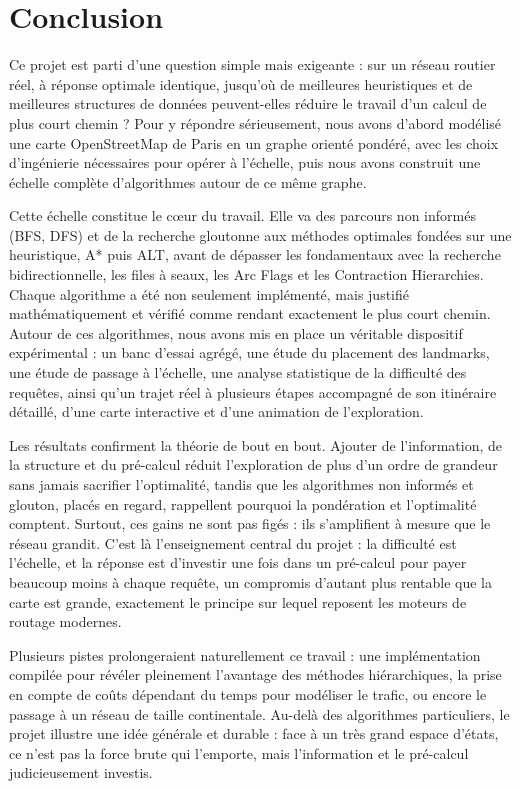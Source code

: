 \chapter{Conclusion}
\label{ch:conclusion}

Ce projet est parti d'une question simple mais exigeante : sur un réseau routier
réel, à réponse optimale identique, jusqu'où de meilleures heuristiques et de
meilleures structures de données peuvent-elles réduire le travail d'un calcul de
plus court chemin ? Pour y répondre sérieusement, nous avons d'abord modélisé une
carte OpenStreetMap de Paris en un graphe orienté pondéré, avec les choix
d'ingénierie nécessaires pour opérer à l'échelle, puis nous avons construit une
échelle complète d'algorithmes autour de ce même graphe.

\medskip

Cette échelle constitue le cœur du travail. Elle va des parcours non informés
(BFS, DFS) et de la recherche gloutonne aux méthodes optimales fondées sur une
heuristique, A* puis ALT, avant de dépasser les fondamentaux avec la recherche
bidirectionnelle, les files à seaux, les Arc Flags et les Contraction
Hierarchies. Chaque algorithme a été non seulement implémenté, mais justifié
mathématiquement et vérifié comme rendant exactement le plus court chemin. Autour
de ces algorithmes, nous avons mis en place un véritable dispositif expérimental :
un banc d'essai agrégé, une étude du placement des landmarks, une étude de passage
à l'échelle, une analyse statistique de la difficulté des requêtes, ainsi qu'un
trajet réel à plusieurs étapes accompagné de son itinéraire détaillé, d'une carte
interactive et d'une animation de l'exploration.

\medskip

Les résultats confirment la théorie de bout en bout. Ajouter de l'information, de
la structure et du pré-calcul réduit l'exploration de plus d'un ordre de grandeur
sans jamais sacrifier l'optimalité, tandis que les algorithmes non informés et
glouton, placés en regard, rappellent pourquoi la pondération et l'optimalité
comptent. Surtout, ces gains ne sont pas figés : ils s'amplifient à mesure que le
réseau grandit. C'est là l'enseignement central du projet : la difficulté est
l'échelle, et la réponse est d'investir une fois dans un pré-calcul pour payer
beaucoup moins à chaque requête, un compromis d'autant plus rentable que la carte
est grande, exactement le principe sur lequel reposent les moteurs de routage
modernes.

\medskip

Plusieurs pistes prolongeraient naturellement ce travail : une implémentation
compilée pour révéler pleinement l'avantage des méthodes hiérarchiques, la prise
en compte de coûts dépendant du temps pour modéliser le trafic, ou encore le
passage à un réseau de taille continentale. Au-delà des algorithmes particuliers,
le projet illustre une idée générale et durable : face à un très grand espace
d'états, ce n'est pas la force brute qui l'emporte, mais l'information et le
pré-calcul judicieusement investis.
